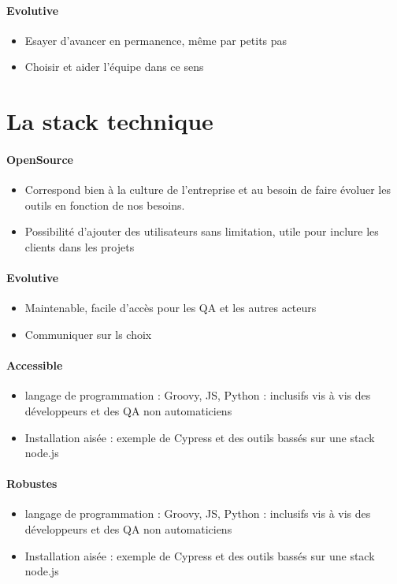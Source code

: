 \begin{frame}{\insertsectionhead}
  \framesubtitle{Evolutive}
    \begin{itemize}
    \item Esayer d'avancer en permanence, même par petits pas
    \item Choisir et aider l'équipe dans ce sens
    \end{itemize}
\end{frame}

\section{La stack technique}

\begin{frame}{\insertsectionhead}
  \framesubtitle{OpenSource}
    \begin{itemize}
      \item Correspond bien à la culture de l'entreprise et au besoin de faire évoluer les outils en fonction de nos besoins.
      \item Possibilité d'ajouter des utilisateurs sans limitation, utile pour inclure les clients dans les projets
    \end{itemize}
\end{frame}

\begin{frame}{\insertsectionhead}
  \framesubtitle{Evolutive}
    \begin{itemize}
      \item Maintenable, facile d'accès pour les QA et les autres acteurs
      \item Communiquer sur ls choix
    \end{itemize}
\end{frame}

\begin{frame}{\insertsectionhead}
  \framesubtitle{Accessible}
    \begin{itemize}
      \item langage de programmation : Groovy, JS, Python : inclusifs vis à vis des développeurs et des QA non automaticiens
      \item Installation aisée : exemple de Cypress et des outils bassés sur une stack node.js
    \end{itemize}
\end{frame}

\begin{frame}{\insertsectionhead}
  \framesubtitle{Robustes}
    \begin{itemize}
      \item langage de programmation : Groovy, JS, Python : inclusifs vis à vis des développeurs et des QA non automaticiens
      \item Installation aisée : exemple de Cypress et des outils bassés sur une stack node.js
    \end{itemize}
\end{frame}

